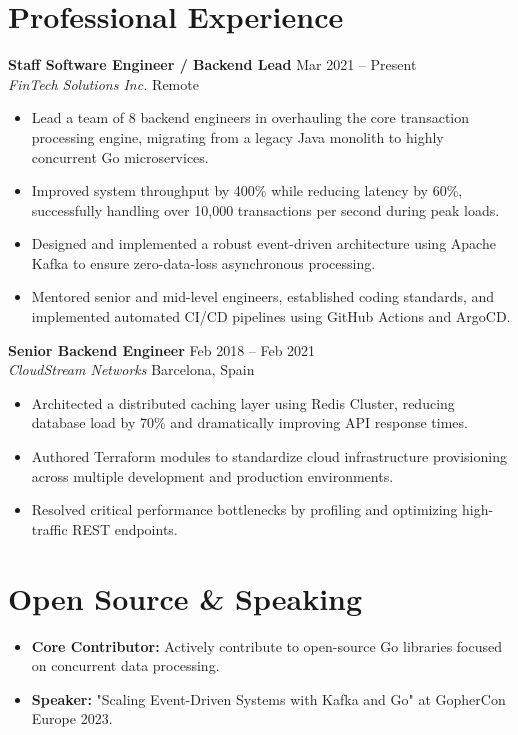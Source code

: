 \documentclass[11pt, a4paper]{article}
\begin{document}
\section*{Professional Experience}
\textbf{Staff Software Engineer / Backend Lead} \hfill Mar 2021 -- Present \\
\textit{FinTech Solutions Inc.} \hfill Remote
\begin{itemize}[leftmargin=0.2in, nosep, itemsep=2pt]
    \item Lead a team of 8 backend engineers in overhauling the core transaction processing engine, migrating from a legacy Java monolith to highly concurrent Go microservices.
    \item Improved system throughput by 400\% while reducing latency by 60\%, successfully handling over 10,000 transactions per second during peak loads.
    \item Designed and implemented a robust event-driven architecture using Apache Kafka to ensure zero-data-loss asynchronous processing.
    \item Mentored senior and mid-level engineers, established coding standards, and implemented automated CI/CD pipelines using GitHub Actions and ArgoCD.
\end{itemize}
\vspace{1.5ex}

\textbf{Senior Backend Engineer} \hfill Feb 2018 -- Feb 2021 \\
\textit{CloudStream Networks} \hfill Barcelona, Spain
\begin{itemize}[leftmargin=0.2in, nosep, itemsep=2pt]
    \item Architected a distributed caching layer using Redis Cluster, reducing database load by 70\% and dramatically improving API response times.
    \item Authored Terraform modules to standardize cloud infrastructure provisioning across multiple development and production environments.
    \item Resolved critical performance bottlenecks by profiling and optimizing high-traffic REST endpoints.
\end{itemize}

\section*{Open Source \& Speaking}
\begin{itemize}[leftmargin=0.2in, label={-}, nosep, itemsep=2pt]
    \item \textbf{Core Contributor:} Actively contribute to open-source Go libraries focused on concurrent data processing.
    \item \textbf{Speaker:} "Scaling Event-Driven Systems with Kafka and Go" at GopherCon Europe 2023.
\end{itemize}
\end{document}
